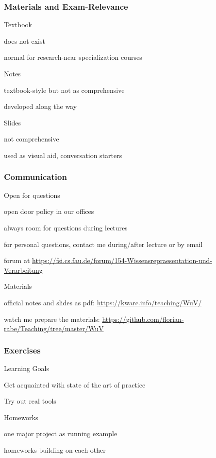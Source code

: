 \begin{frame}\frametitle{Materials and Exam-Relevance}
\begin{blockitems}{Textbook}
\item does not exist
\item normal for research-near specialization courses
\end{blockitems}

\begin{blockitems}{Notes}
\item textbook-style but not as comprehensive
\item developed along the way
\end{blockitems}

\begin{blockitems}{Slides}
\item not comprehensive
\item used as visual aid, conversation starters
\end{blockitems}
\end{frame}

\begin{frame}\frametitle{Communication}
\begin{blockitems}{Open for questions}
\item open door policy in our offices
\item always room for questions during lectures
\item for personal questions, contact me during/after lecture or by email
\item forum at \url{https://fsi.cs.fau.de/forum/154-Wissensrepraesentation-und-Verarbeitung}
\end{blockitems}

\begin{blockitems}{Materials}
\item official notes and slides as pdf: \url{https://kwarc.info/teaching/WuV/}
\item watch me prepare the materials: \url{https://github.com/florian-rabe/Teaching/tree/master/WuV}
\end{blockitems}
\end{frame}

\begin{frame}\frametitle{Exercises}
\begin{blockitems}{Learning Goals}
\item Get acquainted with state of the art of practice
\item Try out real tools
\end{blockitems}

\begin{blockitems}{Homeworks}
\item one major project as running example
\item homeworks building on each other
\end{blockitems}
\end{frame}

